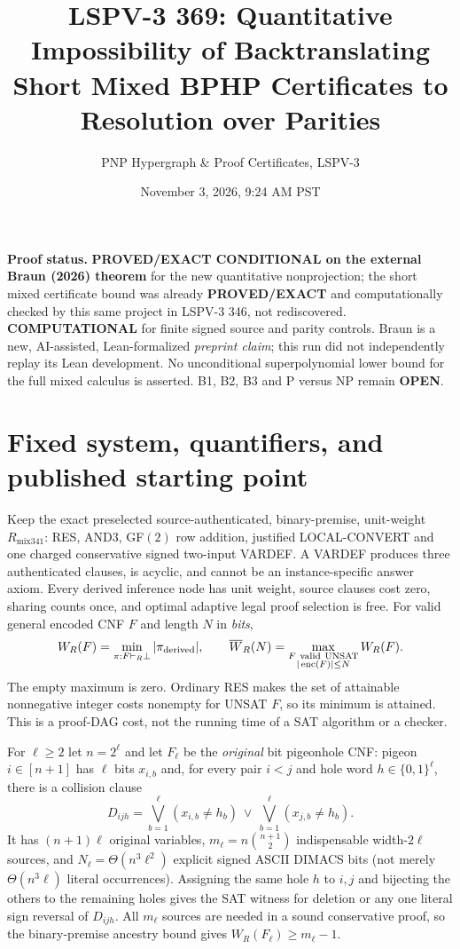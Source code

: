 \documentclass[11pt]{article}
\title{LSPV-3 369: Quantitative Impossibility of Backtranslating Short Mixed BPHP Certificates to Resolution over Parities}
\author{PNP Hypergraph \& Proof Certificates, LSPV-3}
\date{November 3, 2026, 9:24 AM PST}
\begin{document}
\maketitle
\noindent\textbf{Proof status.} \textbf{PROVED/EXACT CONDITIONAL on the external Braun (2026) theorem} for the new quantitative nonprojection; the short mixed certificate bound was already \textbf{PROVED/EXACT} and computationally checked by this same project in LSPV-3 346, not rediscovered. \textbf{COMPUTATIONAL} for finite signed source and parity controls. Braun is a new, AI-assisted, Lean-formalized \emph{preprint claim}; this run did not independently replay its Lean development. No unconditional superpolynomial lower bound for the full mixed calculus is asserted. B1, B2, B3 and P versus NP remain \textbf{OPEN}.

\section*{Fixed system, quantifiers, and published starting point}
Keep the exact preselected source-authenticated, binary-premise, unit-weight $R_{\mathrm{mix341}}$: RES, AND3, GF$(2)$ row addition, justified LOCAL-CONVERT and one charged conservative signed two-input VARDEF. A VARDEF produces three authenticated clauses, is acyclic, and cannot be an instance-specific answer axiom. Every derived inference node has unit weight, source clauses cost zero, sharing counts once, and optimal adaptive legal proof selection is free. For valid general encoded CNF $F$ and length $N$ in \emph{bits},
\[
 W_R(F)=\min_{\pi:F\vdash_R\bot}|\pi_{\rm derived}|,\qquad
 \overline W_R(N)=\max_{\substack{F\ {\rm valid\ UNSAT}\\|\operatorname{enc}(F)|\le N}}W_R(F).
\]
The empty maximum is zero. Ordinary RES makes the set of attainable nonnegative integer costs nonempty for UNSAT $F$, so its minimum is attained. This is a proof-DAG cost, not the running time of a SAT algorithm or a checker.

For $\ell\ge 2$ let $n=2^\ell$ and let $F_\ell$ be the \emph{original} bit pigeonhole CNF: pigeon $i\in[n+1]$ has $\ell$ bits $x_{i,b}$ and, for every pair $i<j$ and hole word $h\in\{0,1\}^{\ell}$, there is a collision clause
\[
 D_{ijh}=\bigvee_{b=1}^\ell (x_{i,b}\ne h_b)\ \vee\
          \bigvee_{b=1}^\ell (x_{j,b}\ne h_b).
\]
It has $(n+1)\ell$ original variables, $m_\ell=n\binom{n+1}{2}$ indispensable width-$2\ell$ sources, and $N_\ell=\Theta(n^3\ell^2)$ explicit signed ASCII DIMACS bits (not merely $\Theta(n^3\ell)$ literal occurrences). Assigning the same hole $h$ to $i,j$ and bijecting the others to the remaining holes gives the SAT witness for deletion or any one literal sign reversal of $D_{ijh}$. All $m_\ell$ sources are needed in a sound conservative proof, so the binary-premise ancestry bound gives $W_R(F_\ell)\ge m_\ell-1$.
\end{document}
